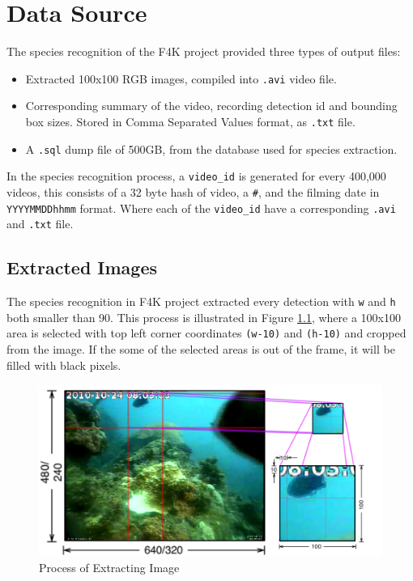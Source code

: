 \documentclass[bsc,logo,twoside,fullspacing,parskip]{infthesis}
\begin{document}
\chapter{Data Source}
\label{chap:datasource}

The species recognition of the F4K project provided three types of output files:
\begin{itemize}
\setlength{\parskip}{1pt}
\item
Extracted 100x100 RGB images, compiled into {\tt .avi} video file.
\item
Corresponding summary of the video, recording detection id and bounding box sizes. Stored in Comma Separated Values format, as {\tt .txt} file.
\item
A {\tt .sql} dump file of 500GB, from the database used for species extraction.
\end{itemize}

In the species recognition process, a {\tt video\_id} is generated for every 400,000 videos, this consists of a 32 byte hash of video, a {\tt \#}, and the filming date in {\tt YYYYMMDDhhmm} format. Where each of the {\tt video\_id} have a corresponding {\tt .avi} and {\tt .txt} file.

\section{Extracted Images}
\label{sec:summaries}

The species recognition in F4K project extracted every detection with {\tt w} and {\tt h} both smaller than 90. 
This process is illustrated in Figure \ref{fig:extraction}, where a 100x100 area is selected with top left corner coordinates {\tt (w-10)} and {\tt (h-10)} and cropped from the image.
If the some of the selected areas is out of the frame, it will be filled with black pixels.

\begin{figure}[ht]
    \centering
    \includegraphics[scale=0.3]{graph/extraction.png}
    \caption{Process of Extracting Image}
    \label{fig:extraction}
\end{figure}
\end{document}
